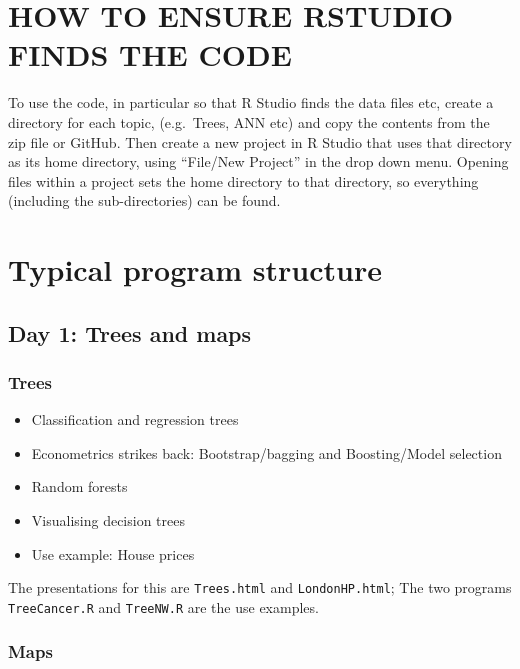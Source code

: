 \documentclass[
  letterpaper,
]{book}
\providecommand{\tightlist}{%
  \setlength{\itemsep}{0pt}\setlength{\parskip}{0pt}}\usepackage{longtable,booktabs,array}
\begin{document}
\hypertarget{how-to-ensure-rstudio-finds-the-code}{%
\section{HOW TO ENSURE RSTUDIO FINDS THE
CODE}\label{how-to-ensure-rstudio-finds-the-code}}

To use the code, in particular so that R Studio finds the data files
etc, create a directory for each topic, (e.g.~Trees, ANN etc) and copy
the contents from the zip file or GitHub. Then create a new project in R
Studio that uses that directory as its home directory, using ``File/New
Project'' in the drop down menu. Opening files within a project sets the
home directory to that directory, so everything (including the
sub-directories) can be found.

\hypertarget{typical-program-structure}{%
\section{Typical program structure}\label{typical-program-structure}}

\hypertarget{day-1-trees-and-maps}{%
\subsection{Day 1: Trees and maps}\label{day-1-trees-and-maps}}

\hypertarget{trees}{%
\subsubsection{Trees}\label{trees}}

\begin{itemize}
\tightlist
\item
  Classification and regression trees
\item
  Econometrics strikes back: Bootstrap/bagging and Boosting/Model
  selection
\item
  Random forests
\item
  Visualising decision trees
\item
  Use example: House prices
\end{itemize}

The presentations for this are \texttt{Trees.html} and
\texttt{LondonHP.html}; The two programs \texttt{TreeCancer.R} and
\texttt{TreeNW.R} are the use examples.

\hypertarget{maps}{%
\subsubsection{Maps}\label{maps}}
\end{document}
